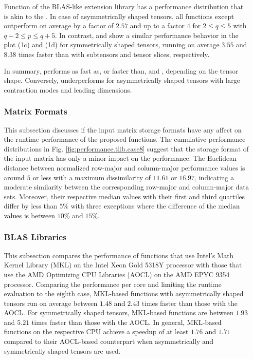 Function  of the BLAS-like extension library has a performance distribution that is akin to the .
In case of asymmetrically shaped tensors, all functions except  outperform  on average by a factor of $2.57$ and up to a factor $4$ for $2 \leq q\leq5$ with $q+2 \leq p \leq q+5$. %
In contrast,  and  show a similar performance behavior in the plot (1c) and (1d) for symmetrically shaped tensors, running on average $3.55$ and $8.38$ times faster than  with subtensors and tensor slices, respectively.

In summary,  performs as fast as, or faster than,  and , depending on the tensor shape. 
Conversely,  underperforms for asymmetrically shaped tensors with large contraction modes and leading dimensions.

\subsubsection{Matrix Formats}
This subsection discusses if the input matrix storage formats have any affect on the runtime performance of the proposed functions.
The cumulative performance distributions in Fig. \ref{fig:performance.tlib.case8} suggest that the storage format of the input matrix has only a minor impact on the performance.
The Euclidean distance between normalized row-major and column-major performance values is around $5$ or less with a maximum dissimilarity of $11.61$ or $16.97$, indicating a moderate similarity between the corresponding row-major and column-major data sets.
Moreover, their respective median values with their first and third quartiles differ by less than $5$\% with three exceptions where the difference of the median values is between $10$\% and $15$\%.


\subsubsection{BLAS Libraries}
This subsection compares the performance of functions that use Intel's Math Kernel Library (MKL) on the Intel Xeon Gold 5318Y processor with those that use the AMD Optimizing CPU Libraries (AOCL) on the AMD EPYC 9354 processor. 
Comparing the performance per core and limiting the runtime evaluation to the eighth case, MKL-based functions with asymmetrically shaped tensors run on average between $1.48$ and $2.43$ times faster than those with the AOCL.
For symmetrically shaped tensors, MKL-based functions are between $1.93$ and $5.21$ times faster than those with the AOCL.
In general, MKL-based functions on the respective CPU achieve a speedup of at least $1.76$ and $1.71$ compared to their AOCL-based counterpart when asymmetrically and symmetrically shaped tensors are used.

